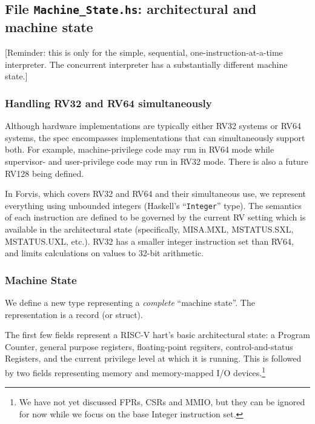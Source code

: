 \documentclass[11pt]{article}
\begin{document}

\subsection{File {\tt Machine\_State.hs}: architectural and machine state}

\label{sec_machine_state}

[Reminder: this is only for the simple, sequential,
one-instruction-at-a-time interpreter.  The concurrent interpreter has
a substantially different machine state.]


\subsubsection{Handling RV32 and RV64 simultaneously}

Although hardware implementations are typically either RV32 systems or
RV64 systems, the spec encompasses implementations that can
simultaneously support both.  For example, machine-privilege code may
run in RV64 mode while supervisor- and user-privilege code may run in
RV32 mode.  There is also a future RV128 being defined.

In Forvis, which covers RV32 and RV64 and their simultaneous use, we
represent everything using unbounded integers (Haskell's
``\verb|Integer|'' type).  The semantics of each instruction are
defined to be governed by the current RV setting which is available in
the architectural state (specifically, MISA.MXL, MSTATUS.SXL,
MSTATUS.UXL, etc.).  RV32 has a smaller integer instruction set than
RV64, and limits calculations on values to 32-bit arithmetic.


\subsubsection{Machine State}

We define a new type representing a \emph{complete} ``machine state''.
The representation is a record (or struct).



The first few fields represent a RISC-V hart's basic architectural
state: a Program Counter, general purpose registers, floating-point
regsiters, control-and-status Registers, and the current privilege
level at which it is running. This is followed by two fields
representing memory and memory-mapped I/O devices.\footnote{We have
not yet discussed FPRs, CSRs and MMIO, but they can be ignored for now
while we focus on the base Integer instruction set.}
\end{document}
